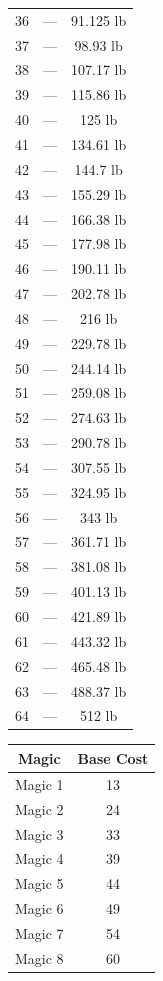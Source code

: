 \begin{multicols*}{3}
\begin{center}
{\begin{tabular}{|c|c|c|}
			36 & — & 91.125 lb \\
			37 & — & 98.93 lb \\
			38 & — & 107.17 lb \\
			39 & — & 115.86 lb \\
			40 & — & 125 lb \\
			41 & — & 134.61 lb \\
			42 & — & 144.7 lb \\
			43 & — & 155.29 lb \\
			44 & — & 166.38 lb \\
			45 & — & 177.98 lb \\
			46 & — & 190.11 lb \\
			47 & — & 202.78 lb \\
			48 & — & 216 lb \\
			49 & — & 229.78 lb \\
			50 & — & 244.14 lb \\
			51 & — & 259.08 lb \\
			52 & — & 274.63 lb \\
			53 & — & 290.78 lb \\
			54 & — & 307.55 lb \\
			55 & — & 324.95 lb \\
			56 & — & 343 lb \\
			57 & — & 361.71 lb \\
			58 & — & 381.08 lb \\
			59 & — & 401.13 lb \\
			60 & — & 421.89 lb \\
			61 & — & 443.32 lb \\
			62 & — & 465.48 lb \\
			63 & — & 488.37 lb \\
			64 & — & 512 lb \\
			\hline
		\end{tabular}
		}
	\end{center}
	
	\begin{center}
		\begin{tabular}{|c|c|}
			\hline
			Magic & Base Cost \\
			\hline
			\hline
			Magic 1 & 13 \\
			Magic 2 & 24 \\
			Magic 3 & 33 \\
			Magic 4 & 39 \\
			Magic 5 & 44 \\
			Magic 6 & 49 \\
			Magic 7 & 54 \\
			Magic 8 & 60 \\
			\hline
		\end{tabular}
	\end{center}
	

\end{multicols*}
